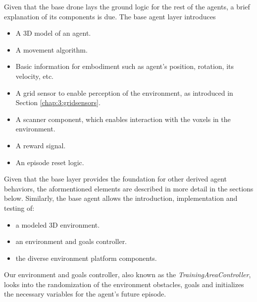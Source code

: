 Given that the base drone lays the ground logic for the rest of the agents, a brief explanation of its components is due. The base agent layer introduces 
\begin{itemize}
    \item A 3D model of an agent.
    \item A movement algorithm.
    \item Basic information for embodiment such as agent's position, rotation, its velocity, etc. 
    \item A grid sensor to enable perception of the environment, as introduced in Section \ref{chap:3:gridsensors}.  
    \item A scanner component, which enables interaction with the voxels in the environment.
    \item A reward signal.
    \item An episode reset logic.
\end{itemize}

Given that the base layer provides the foundation for other derived agent behaviors, the aformentioned elements are described in more detail in the sections below. Similarly, the base agent allows the introduction, implementation and testing of:
 
\begin{itemize}
    \item a modeled 3D environment.
    \item an environment and goals controller. 
    \item the diverse environment platform components.
\end{itemize}
Our environment and goals controller, also known as the \textit{TrainingAreaController}, looks into the randomization of the environment obstacles, goals and initializes the necessary variables for the agent’s future episode.




